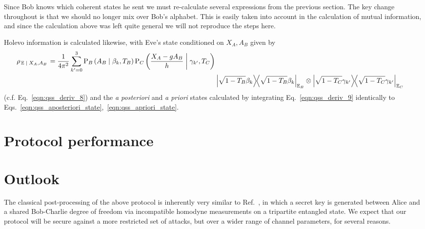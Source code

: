 Since Bob knows which coherent states he sent we must re-calculate several expressions from the previous section.  The key change throughout is that we should no longer mix over Bob's alphabet. This is easily taken into account in the calculation of mutual information, and since the calculation above was left quite general we will not reproduce the steps here.

Holevo information is calculated likewise, with Eve's state conditioned on $X_A, A_B$ given by
\begin{align}\label{eqn:qss_deriv_9}
\rho_{\left.\mathbb{E} \given X_A, A_B\right.} = \frac{1}{4 \pi^2} \sum_{k^\prime=0}^3 \text{P}_B\left(A_B \given \beta_k, T_B\right) \text{P}_C\left(\frac{X_A - g A_B}{h} \given \gamma_{k^\prime}, T_C\right) \notag \\
%
&\dyad{\sqrt{1-T_B} \beta_k}_{\mathbb{E}_B} \otimes \dyad{\sqrt{1-T_C}\gamma_{k^\prime}}_{\mathbb{E}_C}
\end{align}
(c.f. Eq.~\ref{eqn:qss_deriv_8}) and the \emph{a posteriori} and \emph{a priori} states calculated by integrating Eq.~\ref{eqn:qss_deriv_9} identically to Eqs.~\ref{eqn:qss_aposteriori_state},~\ref{eqn:qss_apriori_state}.




\section{Protocol performance}


























\section{Outlook}
The classical post-processing of the above protocol is inherently very similar to Ref.~\cite{Kogias2017}, in which a secret key is generated between Alice and a shared Bob-Charlie degree of freedom via incompatible homodyne measurements on a tripartite entangled state. We expect that our protocol will be secure against a more restricted set of attacks, but over a wider range of channel parameters, for several reasons. 

